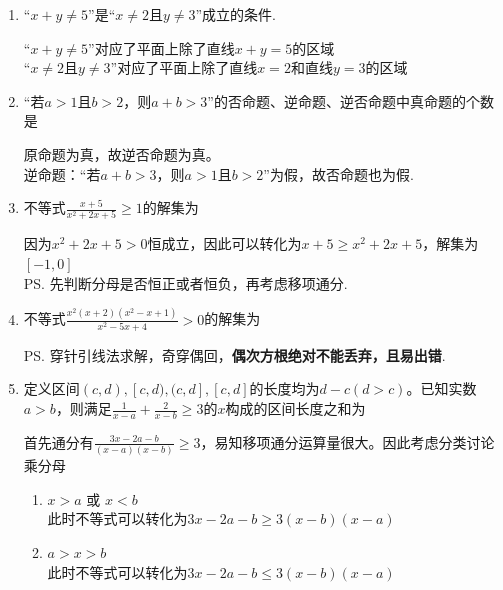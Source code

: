 \begin{enumerate}
\begin{jieda}
        “$x \neq 1 \mbox{或} y \neq 2$”对应了平面上除了点$(1,2)$的区域
    \end{jieda}
    \item “$x+y \neq 5$”是“$x \neq 2 \mbox{且} y \neq 3$”成立的条件.
    \begin{jieda}
        “$x+y \neq 5$”对应了平面上除了直线$x + y = 5$的区域 \\
        “$x \neq 2 \mbox{且} y \neq 3$”对应了平面上除了直线$x = 2$和直线$y = 3$的区域
    \end{jieda}
    \item “若$a > 1$且$b > 2$，则$a+b>3$”的否命题、逆命题、逆否命题中真命题的个数是
    \begin{jieda}
        原命题为真，故逆否命题为真。\\
        逆命题：“若$a+b>3$，则$a > 1$且$b > 2$”为假，故否命题也为假.
    \end{jieda}
    \item 不等式$\frac{x+5}{x^2+2x+5} \geq 1$的解集为\blkda{$[-1, 0]$}
        \begin{jieda}
            因为$x^2+2x+5 > 0$恒成立，因此可以转化为$x+5 \geq x^2+2x+5$，解集为$[-1, 0]$ \\
            \ps 先判断分母是否恒正或者恒负，再考虑移项通分.
        \end{jieda}
        \item 不等式$\frac{x^2(x+2)(x^2-x+1)}{x^2 - 5x + 4} > 0$的解集为
        \begin{jieda}
            \ps 穿针引线法求解，奇穿偶回，\textbf{偶次方根绝对不能丢弃，且易出错}.
        \end{jieda}
    \item 定义区间$(c, d), [c, d), (c, d], [c, d]$的长度均为$d-c (d>c)$。已知实数$a > b$，则满足$\frac{1}{x-a} + \frac{2}{x-b} \geq 3$的$x$构成的区间长度之和为
    \begin{jieda}
        首先通分有$\frac{3x-2a-b}{(x-a)(x-b)} \geq 3$，易知移项通分运算量很大。因此考虑分类讨论乘分母
        \begin{enumerate}
            \item $x > a$ 或 $x < b$ \\
            此时不等式可以转化为$3x-2a-b \geq 3(x-b)(x-a)$
            \item $a > x > b$ \\
            此时不等式可以转化为$3x-2a-b \leq 3(x-b)(x-a)$
        \end{enumerate}

\end{jieda}
\end{enumerate}
